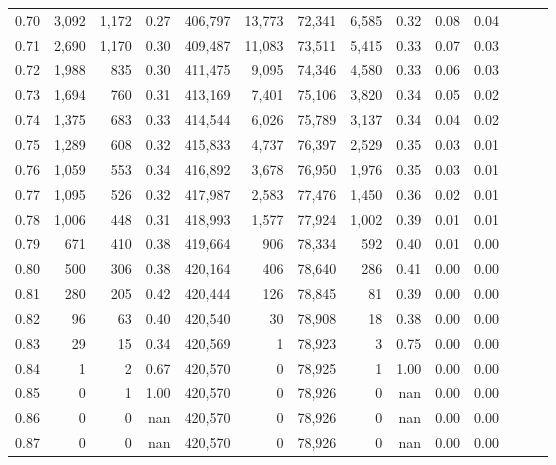 \begin{tabular}{rrrrrrrrrrrrrr}
0.70 &   3,092 &  1,172 &  0.27 &  406,797 &   13,773 &  72,341 &   6,585 &  0.32 &  0.08 &      0.04 \\
0.71 &   2,690 &  1,170 &  0.30 &  409,487 &   11,083 &  73,511 &   5,415 &  0.33 &  0.07 &      0.03 \\
0.72 &   1,988 &    835 &  0.30 &  411,475 &    9,095 &  74,346 &   4,580 &  0.33 &  0.06 &      0.03 \\
0.73 &   1,694 &    760 &  0.31 &  413,169 &    7,401 &  75,106 &   3,820 &  0.34 &  0.05 &      0.02 \\
0.74 &   1,375 &    683 &  0.33 &  414,544 &    6,026 &  75,789 &   3,137 &  0.34 &  0.04 &      0.02 \\
0.75 &   1,289 &    608 &  0.32 &  415,833 &    4,737 &  76,397 &   2,529 &  0.35 &  0.03 &      0.01 \\
0.76 &   1,059 &    553 &  0.34 &  416,892 &    3,678 &  76,950 &   1,976 &  0.35 &  0.03 &      0.01 \\
0.77 &   1,095 &    526 &  0.32 &  417,987 &    2,583 &  77,476 &   1,450 &  0.36 &  0.02 &      0.01 \\
0.78 &   1,006 &    448 &  0.31 &  418,993 &    1,577 &  77,924 &   1,002 &  0.39 &  0.01 &      0.01 \\
0.79 &     671 &    410 &  0.38 &  419,664 &      906 &  78,334 &     592 &  0.40 &  0.01 &      0.00 \\
0.80 &     500 &    306 &  0.38 &  420,164 &      406 &  78,640 &     286 &  0.41 &  0.00 &      0.00 \\
0.81 &     280 &    205 &  0.42 &  420,444 &      126 &  78,845 &      81 &  0.39 &  0.00 &      0.00 \\
0.82 &      96 &     63 &  0.40 &  420,540 &       30 &  78,908 &      18 &  0.38 &  0.00 &      0.00 \\
0.83 &      29 &     15 &  0.34 &  420,569 &        1 &  78,923 &       3 &  0.75 &  0.00 &      0.00 \\
0.84 &       1 &      2 &  0.67 &  420,570 &        0 &  78,925 &       1 &  1.00 &  0.00 &      0.00 \\
0.85 &       0 &      1 &  1.00 &  420,570 &        0 &  78,926 &       0 &   nan &  0.00 &      0.00 \\
0.86 &       0 &      0 &   nan &  420,570 &        0 &  78,926 &       0 &   nan &  0.00 &      0.00 \\
0.87 &       0 &      0 &   nan &  420,570 &        0 &  78,926 &       0 &   nan &  0.00 &      0.00 \\

\end{tabular}
